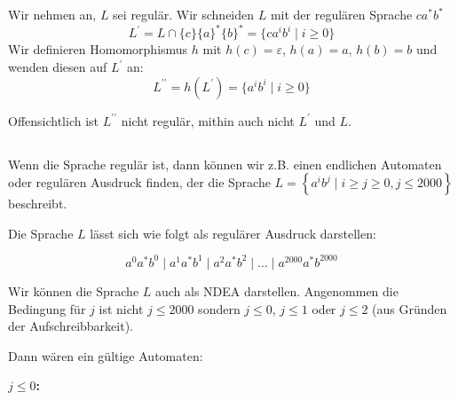 \documentclass{article}
\begin{document}
   \subsection{} 

   Wir nehmen an, $L$ sei regulär. Wir schneiden $L$ mit der regulären Sprache
   ${c}{a}^*{b}^*$
   \begin{equation*}
      L^\prime = L \cap \{c\}\{a\}^*\{b\}^* = \{c a^i b^i \mid i \ge 0\}
   \end{equation*}
   Wir definieren 
   Homomorphismus $h$ mit $h(c) = \varepsilon$, $h(a) = a$, $h(b) = b$ und wenden
   diesen auf $L^\prime$ an:
   \begin{equation*}
      L^{\prime\prime} = h(L^\prime) = \{a^i b^i \mid i \ge 0\}
   \end{equation*}

   Offensichtlich ist $L^{\prime\prime}$ nicht regulär,  mithin auch nicht
   $L^\prime$ und $L$.

   \subsection{} 

   Wenn die Sprache regul\"ar ist, dann k\"onnen wir z.B. einen endlichen
   Automaten oder regul\"aren Ausdruck finden, der die Sprache $L =
   \left\{a^ib^j \mid i \geq j \geq 0, j \leq 2000 \right\}$ beschreibt.

   Die Sprache $L$ l\"asst sich wie folgt als regul\"arer Ausdruck
   darstellen:

   \begin{equation*}
      a^0a^*b^0 \mid a^1a^*b^1 \mid a^2a^*b^2 \mid \ldots \mid a^{2000}a^*b^{2000}
   \end{equation*}

   Wir k\"onnen die Sprache $L$ auch als NDEA darstellen. Angenommen
   die Bedingung f\"ur $j$ ist nicht $j \leq 2000$ sondern $j \leq 0$, $j\leq
   1$ oder $j \leq 2$ (aus Gr\"unden der Aufschreibbarkeit).

   Dann w\"aren ein g\"ultige Automaten:

   \textbf{$j \leq 0$:}

   \begin{center}
   \end{center}
\end{document}
